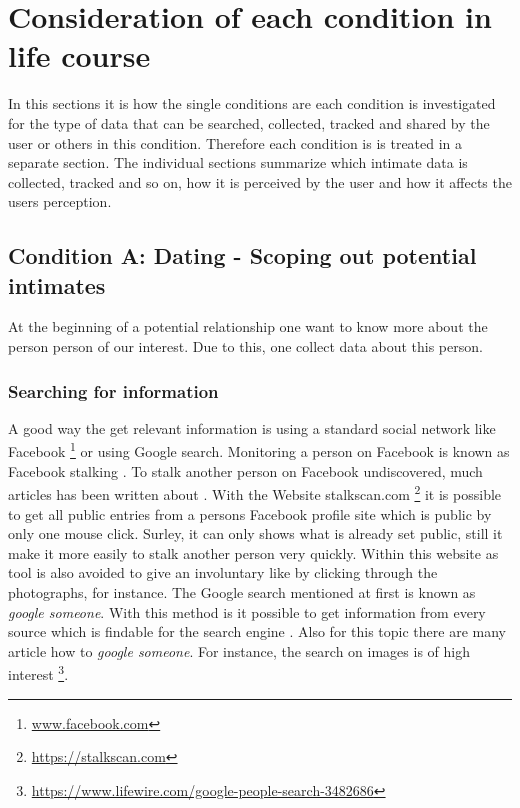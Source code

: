 \section{Consideration of each condition in life course}
\label{sec:consideration_life_course_conditions}
In this sections it is  how the single conditions are
each condition is investigated for the type of data that can be searched, collected, tracked and shared by the user or others in this condition.
Therefore each condition is is treated in a separate section. The individual sections summarize which intimate data is collected, tracked and so on, how it is perceived by the user and how it affects the users perception.


 
\subsection{Condition A: Dating - Scoping out potential intimates}
\label{subsec:A}
At the beginning of a potential relationship one want to know more about the person person of our interest. Due to this, one collect data about this person. 
\subsubsection{Searching for information}
A good way the get relevant information is using a standard social network like Facebook \footnote{\url{www.facebook.com}} or using Google search. Monitoring a person on Facebook is known as Facebook stalking \cite{levy2014intimate}. To stalk another person on Facebook undiscovered, much articles has been written about \cite{sueddeutsche_fb_stalking}. With the Website stalkscan.com \footnote{\url{https://stalkscan.com}} it is possible to get all public entries from a persons Facebook profile site which is public by only one mouse click. Surley, it can only shows what is already set public, still it make it more easily to stalk another person very quickly.
Within this website as tool is also avoided to give an involuntary like by clicking through the photographs, for instance.
The Google search mentioned at first is known as \textit{google someone}. With this method is it possible to get information from every source which is findable for the search engine \cite{nolan2005hacking}. Also for this topic there are many article how to \textit{google someone}. For instance, the search on images is of high interest \footnote{\url{https://www.lifewire.com/google-people-search-3482686}}.



